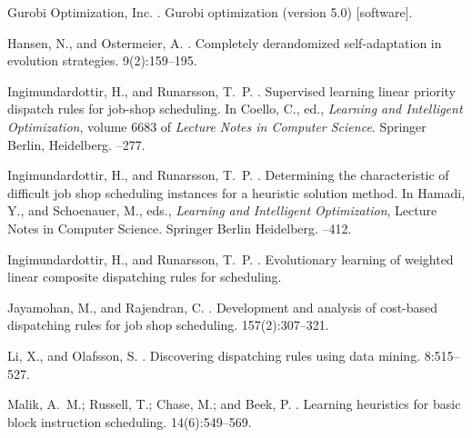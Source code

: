 \documentclass[letterpaper]{article}
\begin{document}
 
%

\begin{thebibliography}{}

{Gurobi Optimization, Inc.}
.
\newblock Gurobi optimization (version 5.0) [software].

Hansen, N., and Ostermeier, A.
.
\newblock Completely derandomized self-adaptation in evolution strategies.
 9(2):159--195.

Ingimundardottir, H., and Runarsson, T.~P.
.
\newblock Supervised learning linear priority dispatch rules for job-shop
  scheduling.
\newblock In Coello, C., ed., {\em Learning and Intelligent Optimization},
  volume 6683 of {\em Lecture Notes in Computer Science}. Springer Berlin,
  Heidelberg.
--277.

Ingimundardottir, H., and Runarsson, T.~P.
.
\newblock Determining the characteristic of difficult job shop scheduling
  instances for a heuristic solution method.
\newblock In Hamadi, Y., and Schoenauer, M., eds., {\em Learning and
  Intelligent Optimization}, Lecture Notes in Computer Science. Springer Berlin
  Heidelberg.
--412.

Ingimundardottir, H., and Runarsson, T.~P.
.
\newblock Evolutionary learning of weighted linear composite dispatching rules
  for scheduling.

Jayamohan, M., and Rajendran, C.
.
\newblock Development and analysis of cost-based dispatching rules for job shop
  scheduling.
 157(2):307--321.

Li, X., and Olafsson, S.
.
\newblock Discovering dispatching rules using data mining.
 8:515--527.

Malik, A.~M.; Russell, T.; Chase, M.; and Beek, P.
.
\newblock Learning heuristics for basic block instruction scheduling.
 14(6):549--569.


\end{thebibliography}
\end{document}
